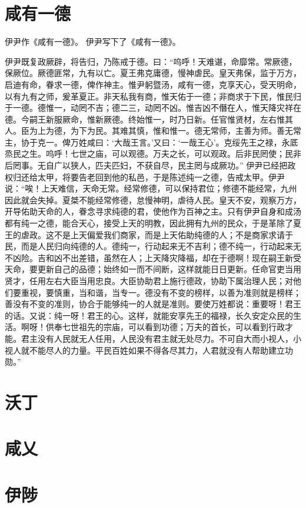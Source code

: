 \documentclass[12pt,UTF8]{ctexbook}
\begin{document}
\chapter{咸有一德}

伊尹作《咸有一德》。
伊尹写下了《咸有一德》。

伊尹既复政厥辟，将告归，乃陈戒于德。曰：“呜呼！天难谌，命靡常。常厥德，保厥位。厥德匪常，九有以亡。夏王弗克庸德，慢神虐民。皇天弗保，监于万方，启迪有命，眷求一德，俾作神主。惟尹躬暨汤，咸有一德，克享天心，受天明命，以有九有之师，爰革夏正。非天私我有商，惟天佑于一德；非商求于下民，惟民归于一德。德惟一，动罔不吉；德二三，动罔不凶。惟吉凶不僭在人，惟天降灾祥在德。今嗣王新服厥命，惟新厥德。终始惟一，时乃日新。任官惟贤材，左右惟其人。臣为上为德，为下为民。其难其慎，惟和惟一。德无常师，主善为师。善无常主，协于克一。俾万姓咸曰：‘大哉王言。’又曰：‘一哉王心’。克绥先王之禄，永厎烝民之生。呜呼！七世之庙，可以观德。万夫之长，可以观政。后非民罔使；民非后罔事。无自广以狭人，匹夫匹妇，不获自尽，民主罔与成厥功。”
伊尹已经把政权归还给太甲，将要告老回到他的私邑，于是陈述纯一之德，告戒太甲。伊尹说：“唉！上天难信，天命无常。经常修德，可以保持君位；修德不能经常，九州因此就会失掉。夏桀不能经常修德，怠慢神明，虐待人民。皇天不安，观察万方，开导佑助天命的人，眷念寻求纯德的君，使他作为百神之主。只有伊尹自身和成汤都有纯一之德，能合天心，接受上天的明教，因此拥有九州的民众，于是革除了夏王的虐政。这不是上天偏爱我们商家，而是上天佑助纯德的人；不是商家求请于民，而是人民归向纯德的人。德纯一，行动起来无不吉利；德不纯一，行动起来无不凶险。吉和凶不出差错，虽然在人；上天降灾降福，却在于德啊！现在嗣王新受天命，要更新自己的品德；始终如一而不间断，这样就能日日更新。任命官吏当用贤才，任用左右大臣当用忠良。大臣协助君上施行德政，协助下属治理人民；对他们要重视，要慎重，当和谐，当专一。德没有不变的榜样，以善为准则就是榜样；善没有不变的准则，协合于能够纯一的人就是准则。要使万姓都说：重要呀！君王的话。又说：纯一呀！君王的心。这样，就能安享先王的福禄，长久安定众民的生活。啊呀！供奉七世祖先的宗庙，可以看到功德；万夫的首长，可以看到行政才能。君主没有人民就无人任用，人民没有君主就无处尽力。不可自大而小视人，小视人就不能尽人的力量。平民百姓如果不得各尽其力，人君就没有人帮助建立功勋。”
\chapter{沃丁}
\chapter{咸乂}
\chapter{伊陟}
\end{document}
